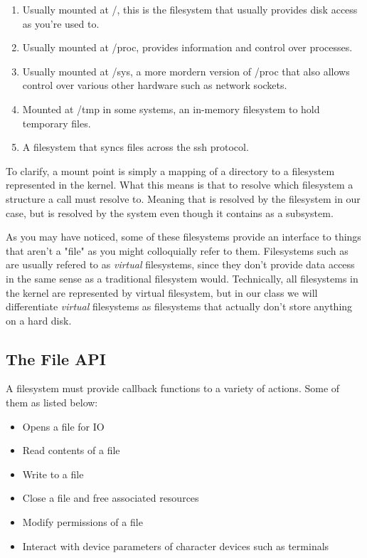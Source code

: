 \begin{enumerate}

  \item {} Usually mounted at /, this is the filesystem that usually provides disk access as you're used to.
  \item {} Usually mounted at /proc, provides information and control over processes.
  \item {} Usually mounted at /sys, a more mordern version of /proc that also allows control over various other hardware such as network sockets.
  \item {} Mounted at /tmp in some systems, an in-memory filesystem to hold temporary files.
  \item {} A filesystem that syncs files across the ssh protocol.

\end{enumerate}

To clarify, a mount point is simply a mapping of a directory to a filesystem represented in the kernel. What this means is that to resolve which filesystem a structure a call must resolve to. Meaning that  is resolved by the  filesystem in our case, but  is resolved by the  system even though it contains \keyword{/} as a subsystem.

As you may have noticed, some of these filesystems provide an interface to things that aren't a "file" as you might colloquially refer to them. Filesystems such as  are usually refered to as \emph{virtual} filesystems, since they don't provide data access in the same sense as a traditional filesystem would. Technically, all filesystems in the kernel are represented by virtual filesystem, but in our class we will differentiate \emph{virtual} filesystems as filesystems that actually don't store anything on a hard disk.

\subsection{The File API}

A filesystem must provide callback functions to a variety of actions. Some of them as listed below:

\begin{itemize}
  \item {} Opens a file for IO
  \item {} Read contents of a file 
  \item {} Write to a file 
  \item {} Close a file and free associated resources
  \item {} Modify permissions of a file
  \item {} Interact with device parameters of character devices such as terminals
\end{itemize}

